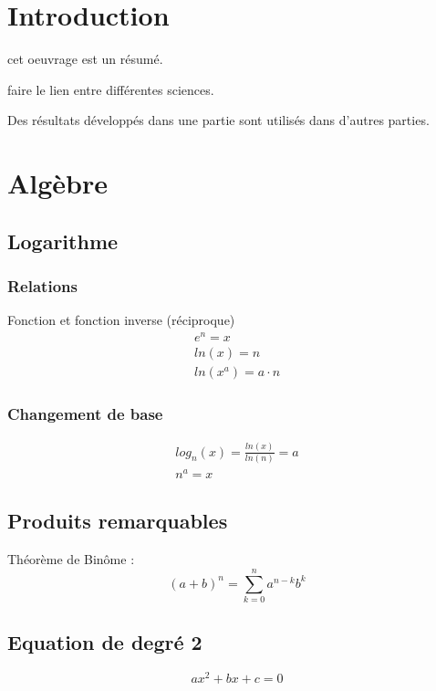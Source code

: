 \documentclass[12pt,a4paper,twoside]{article}
\numberwithin{equation}{subsection}
\begin{document}
\setlength{\parindent}{0cm}

\newpage
\tableofcontents

\newpage
\section{Introduction}

cet oeuvrage est un résumé. 

faire le lien entre différentes sciences.

Des résultats développés dans une partie sont utilisés dans d'autres parties.

\newpage
\section{Algèbre}

\subsection{Logarithme}
\subsubsection{Relations}
Fonction et fonction inverse (réciproque)
\begin{eqnarray}
e^n=x\\
ln(x)=n\\
ln(x^a)=a\cdot n
\end{eqnarray}

\subsubsection{Changement de base}
\begin{eqnarray}
log_{n}(x)=\frac{ln(x)}{ln(n)}=a\\
n^a=x
\end{eqnarray}

\subsection{Produits remarquables}
Théorème de Binôme : 
\begin{equation}
(a+b)^n=\sum_{k=0}^{n}a^{n-k}b^k
\end{equation}
\subsection{Equation de degré 2}
\begin{equation}
a x^2+ bx +c =0
\end{equation}
\end{document}
